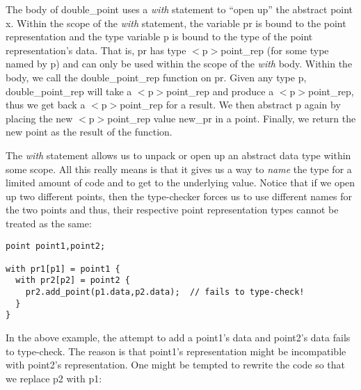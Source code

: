 \documentclass[titlepage,10pt]{article}
\begin{document}
The body of double{\_}point uses a \textit{with} statement to ``open
up'' the abstract point x.  Within the scope of the \textit{with}
statement, the variable pr is bound to the point representation and the
type variable p is bound to the type of the point representation's data.
That is, pr has type $<$p$>$point{\_}rep (for some type named by p) and
can only be used within the scope of the \textit{with} body.  Within the
body, we call the double{\_}point{\_}rep function on pr.  Given any type
p, double{\_}point{\_}rep will take a $<$p$>$point{\_}rep and produce a
$<$p$>$point{\_}rep, thus we get back a $<$p$>$point{\_}rep for a
result.  We then abstract p again by placing the new $<$p$>$point{\_}rep
value new{\_}pr in a point.  Finally, we return the new point as the
result of the function.

The \textit{with} statement allows us to unpack or open up an abstract
data type within some scope.  All this really means is that it gives us
a way to \textit{name} the type for a limited amount of code and to get
to the underlying value.  Notice that if we open up two different
points, then the type-checker forces us to use different names for the
two points and thus, their respective point representation types cannot
be treated as the same:


\begin{verbatim}
point point1,point2;

with pr1[p1] = point1 {
  with pr2[p2] = point2 {
    pr2.add_point(p1.data,p2.data);  // fails to type-check!
  }
}
\end{verbatim}

In the above example, the attempt to add a point1's data and point2's
data fails to type-check.  The reason is that point1's representation
might be incompatible with point2's representation.  One might be
tempted to rewrite the code so that we replace p2 with p1:

\end{document}
